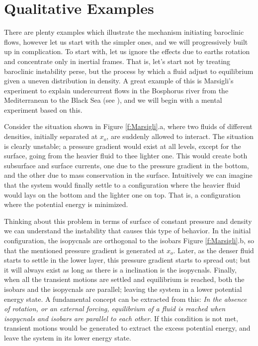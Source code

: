 \section{Qualitative Examples}
\label{s:examples}
There are plenty examples which illustrate the mechanism initiating baroclinic flows, however let us start with the simpler ones, and we will progressively built up in complication. To start with, let us ignore the effects due to earths rotation and concentrate only in inertial frames. That is, let's start not by treating baroclinic instability perse, but the process by which a fluid adjust to equilibrium given a uneven distribution in density. A great example of this is Marsigli's experiment to explain undercurrent flows in the Bosphorus river from the Mediterranean to the Black Sea (see ), and we will begin with a mental experiment based on this.

Consider the situation shown in Figure \ref{f:Marsigli}.a, where two fluids of different densities, initially separated at $x_o$, are suddenly allowed to interact. The situation is clearly unstable; a pressure gradient would exist at all levels, except for the surface, going from the heavier fluid to thee lighter one. This would create both subsurface and surface currents, one due to the pressure gradient in the bottom, and the other due to mass conservation in the surface. Intuitively we can imagine that the system would finally settle to a configuration where the heavier fluid would lays on the bottom and the lighter one on top. That is, a configuration where the potential energy is minimized.

Thinking about this problem in terms of surface of constant pressure and density we can understand the instability that causes this type of behavior. In the initial configuration, the isopycnals are orthogonal to the isobars Figure \ref{f:Marsigli}.b, so that the mentioned pressure gradient is generated at $x_o$. Later, as the denser fluid starts to settle in the lower layer, this pressure gradient starts to spread out; but it will always exist as long as there is a inclination is the isopycnals. Finally, when all the transient motions are settled and equilibrium is reached, both  the isobars and the isopycnals are parallel; leaving the system in a lower potential energy state. A fundamental concept can be extracted from this: \emph{In the absence of rotation, or an external forcing, equilibrium of a fluid is reached when isopycnals and isobars are parallel to each other}. If this condition is not met, transient motions would be generated to extract the excess  potential energy, and leave the system in its lower energy state.

